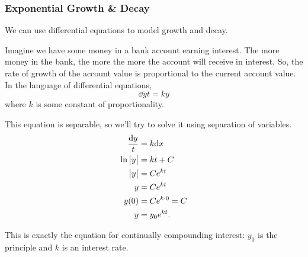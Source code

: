 \subsubsection{Exponential Growth \& Decay}
We can use differential equations to model growth and decay.

\begin{example}
	Imagine we have some money in a bank account earning interest.
	The more money in the bank, the more the more the account will receive in interest.
	So, the rate of growth of the account value is proportional to the current account value.
	In the language of differential equations,
	\begin{equation*}
		\dd{y}{t} = ky
	\end{equation*}
	where $k$ is some constant of proportionality.
\end{example}
\begin{answer}
	This equation is separable, so we'll try to solve it using separation of variables.
	\begin{align*}
		\frac{\mathrm{d} y}{t} &= k\mathrm{d} x \\
		\ln{\big\lvert y \big\rvert} &= kt + C \\
		\big\lvert y \big\rvert &= Ce^{kt} \\
		y &= Ce^{kt} \\
		y(0) &= Ce^{k\cdot 0} = C \\
		y &= y_0e^{kt}.
	\end{align*}
\end{answer}

This is exactly the equation for continually compounding interest: $y_0$ is the principle and $k$ is an interest rate.


